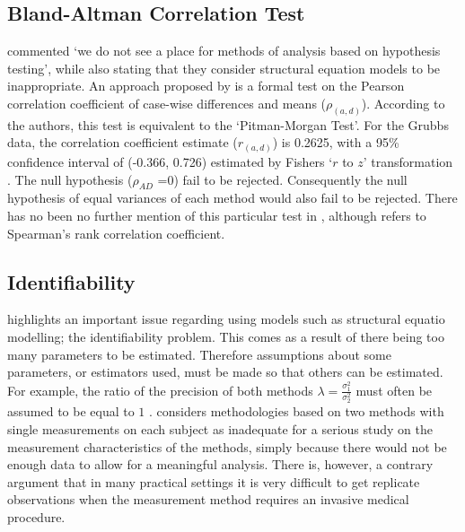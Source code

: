 \documentclass[12pt, a4paper]{report}
\theoremstyle{plain}
\theoremstyle{definition}
\theoremstyle{remark}
\begin{document}
\subsection{Bland-Altman Correlation Test}
\citet{BA99} commented `we do not see a
place for methods of analysis based on hypothesis testing', while also stating that they consider structural equation models to be inappropriate.
An approach proposed by \citet{BA83} is a formal test on the
Pearson correlation coefficient of case-wise differences and means
($\rho_{(a,d)}$). According to the authors, this test is equivalent
to the `Pitman-Morgan Test'. For the Grubbs data, the correlation
coefficient estimate ($r_{(a,d)}$) is 0.2625, with a 95\% confidence
interval of (-0.366, 0.726) estimated by Fishers `$r$ to $z$'
transformation \citep*{cohen2013applied}. The null hypothesis ($\rho_{AD}$ =0)
fail to be rejected. Consequently the null hypothesis of equal
variances of each method would also fail to be rejected. There has
no been no further mention of this particular test in
\citet{BA86}, although \citet{BA99} refers to Spearman's rank
correlation coefficient. 

\subsection{Identifiability}
\citet{DunnSEME} highlights an important issue regarding using
models such as structural equatio modelling; the identifiability problem. This comes as a result of there being too many parameters to be estimated.
Therefore assumptions about some parameters, or estimators used,
must be made so that others can be estimated. For example, the ratio of the precision of both methods $\lambda=\frac{\sigma^{2}_{1}}{\sigma^{2}_{2}}$
must often be assumed to be equal to $1$ \citep{linnet98}.\citet{DunnSEME} considers methodologies based on two methods with single measurements on each subject as inadequate for a serious
study on the measurement characteristics of the methods, simply because there would not be enough data to allow for a meaningful
analysis. There is, however, a contrary argument that in many
practical settings it is very difficult to get replicate
observations when the measurement method requires an invasive medical
procedure.

	
\end{document}
